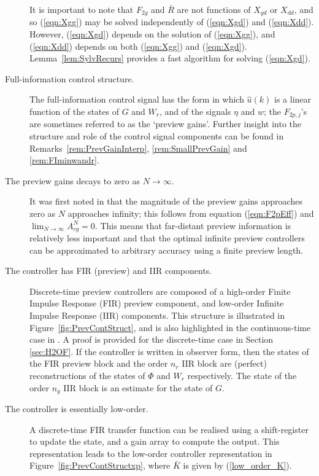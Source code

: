 \begin{description}
It is important to note that $F_{2g}$ and $\bar R$ are not functions of $X_{gd}$ or $X_{dd}$, and so (\ref{eqn:Xgg}) may be solved independently of (\ref{eqn:Xgd}) and (\ref{eqn:Xdd}). However, (\ref{eqn:Xgd}) depends on the solution of (\ref{eqn:Xgg}), and (\ref{eqn:Xdd}) depends on both (\ref{eqn:Xgg}) and (\ref{eqn:Xgd}). Lemma~\ref{lem:SylvRecurs} provides a fast algorithm for solving (\ref{eqn:Xgd}).
\item[Full-information control structure.] The full-information control signal has the form
in which $\hat u(k)$ is a linear function of the states of $G$ and $W_r$, and of the signals $\eta$ and $w$; the $F_{2p,j}$'s are sometimes referred to as the `preview gains'. Further insight into the structure and role of the control signal components can be found in Remarks~\ref{rem:PrevGainInterp}, \ref{rem:SmallPrevGain} and \ref{rem:FIminwandr}.
\item[The preview gains decays to zero as $N \rightarrow \infty$.] It was first noted in \cite{Tomizuka_1975_OptDiscretePreview} that the magnitude of the preview gains approaches zero as $N$ approaches infinity; this follows from equation (\ref{eqn:F2pEff}) and $\lim_{N \rightarrow \infty} A^N_{cg} = 0$. This means that far-distant preview information is relatively less important and that the optimal infinite preview controllers can be approximated  to arbitrary accuracy using a finite preview length.
\item[The controller has FIR (preview) and IIR components.]
Discrete-time preview controllers are composed of a high-order Finite Impulse Response (FIR) preview component, and low-order Infinite Impulse Response (IIR) components. This structure is illustrated in Figure~\ref{fig:PrevContStruct}, and is also highlighted in the continuous-time case in \cite{Moelja_2006_H2PreviewMultiple}. A proof is provided for the discrete-time case in Section \ref{sec:H2OF}. If the controller is written in observer form, then the states of the FIR preview block and the order $n_r$ IIR block are (perfect) reconstructions of the states of $\Phi$ and $W_r$ respectively. The state of the order $n_g$ IIR block is an estimate for the state of $G$.
\item[The controller is essentially low-order.] 
A discrete-time FIR transfer function can be realised using a shift-register to update the state, and a gain array to compute the output. This representation leads to the low-order controller representation in Figure~\ref{fig:PrevContStructxp}, where $\bar{K}$ is given by (\ref{low_order_K}). 

\end{description}

